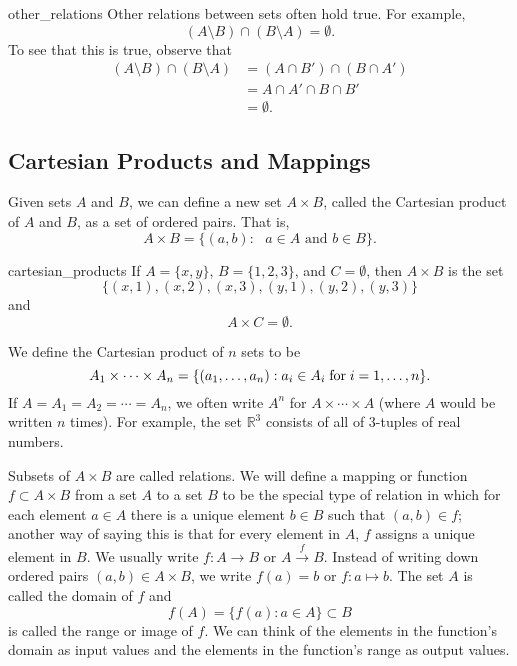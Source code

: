 \begin{example}{other_relations}
Other relations between sets often hold true.  For example,
\[
( A \setminus B) \cap (B \setminus A) = \emptyset.
\]
To see that this is true, observe that
\begin{align*}
( A \setminus B) \cap (B \setminus A)
& =
( A \cap B') \cap (B \cap A') \\
& =
A \cap A' \cap B \cap B' \\
& = \emptyset.
\end{align*}
\end{example}
 
 
\subsection*{Cartesian Products and Mappings}

Given sets $A$ and $B$, we can define a new set $A \times\label{sets_cartesian} B$, called the {\bfi Cartesian product\/}  of $A$ and $B$, as a set of ordered pairs.  That is, 
\[
A \times B = \{ (a,b) : \mbox{ $a \in A$ and $b \in B$} \}.
\]

 
\begin{example}{cartesian_products}
If $A = \{ x, y \}$, $B = \{ 1, 2, 3 \}$, and $C = \emptyset$, then $A \times B$ is the set 
\[
\{ (x, 1), (x, 2), (x, 3), (y, 1), (y, 2), (y, 3) \}
\]
and
\[
A \times C = \emptyset.
\]
\end{example}

We define the {\bfi Cartesian product of $n$ sets\/} to be
\[
A_1 \times \cdots \times A_n = \{ (a_1, \ldots, a_n): a_i \in A_i {\rm\; for\;} i = 1, \ldots, n \}.
\]
If $A = A_1 = A_2 = \cdots = A_n$, we often write $A^n$ for $A \times \cdots \times A$ (where $A$ would be written $n$ times)\label{sets_ncartesian}.   For example, the set ${\mathbb R}^3$ consists of all of 3-tuples of real numbers.
 
Subsets of $A \times B$ are called {\bfi relations}.  We will define a  {\bfi mapping\/} or {\bfi function} $f \subset A \times B$ from a set $A$ to a set $B$ to be the special type of  relation in which for each element $a \in A$ there is a unique element $b \in B$ such that $(a, b) \in f$; another way of saying this is that for every element in $A$, $f$ assigns a unique element in $B$.  We usually write $f:A \rightarrow B$ or $A \stackrel{f}{\rightarrow} B$.  Instead of writing down ordered pairs  $(a,b) \in A \times B$, we write $f(a) = b$ or $f : a \mapsto b$.  The set  $A$ is called the {\bfi domain\/} of $f$ and   
\[
f(A) = \{ f(a) : a \in A \} \subset B
\]
is called the {\bfi range\/} or {\bfi image\/} of $f$.  We can think of the elements in the function's domain as input values and the elements in the function's range as output values.  
 
